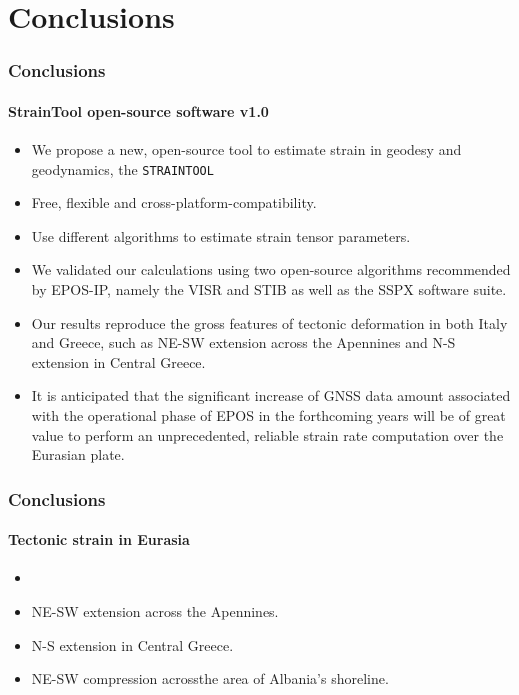 \section{Conclusions}
 

\begin{frame}
 \frametitle{Conclusions}
 \framesubtitle{StrainTool open-source software v1.0}
 \label{ch5:concl}
  
  \begin{itemize}
    \item We propose a new, open-source tool to estimate strain in geodesy and geodynamics, the \texttt{STRAINTOOL}
    \item Free, flexible and cross-platform-compatibility.
    \item Use different algorithms to estimate strain tensor parameters.
    \item We validated our calculations using two open-source algorithms recommended by EPOS-IP, namely the VISR and STIB as well as the SSPX software suite.
    \item Οur results reproduce the gross features of tectonic deformation in both Italy and Greece, such as NE-SW extension across the Apennines and N-S extension in Central Greece.
    \item It is anticipated that the significant increase of GNSS data amount associated with the operational phase of EPOS in the forthcoming years will be of great value to perform an unprecedented, reliable strain rate computation over the Eurasian plate.
  \end{itemize}
\end{frame}
\note{}


\begin{frame}
 \frametitle{Conclusions}
 \framesubtitle{Tectonic strain in Eurasia}
 \label{ch5:concl}
  \begin{itemize}
    \item
    \item NE-SW extension across the Apennines.
    \item N-S extension in Central Greece.
    \item NE-SW compression acrossthe area of Albania's shoreline.
  \end{itemize}

\end{frame}
\note{}


